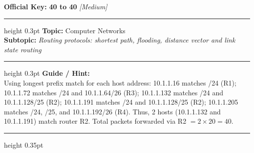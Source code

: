 \documentclass[a4paper,10pt]{article}
\begin{document}
\begin{tcolorbox}
\textbf{Official Key:} \textbf{\large 40 to 40} \hfill \textit{\small [Medium]}
\vspace{2pt}\hrule height 0.3pt\vspace{3pt}
\textbf{Topic:} Computer Networks \\
\textbf{Subtopic:} \textit{Routing protocols: shortest path, flooding, distance vector and link state routing}
\vspace{2pt}\hrule height 0.3pt\vspace{3pt}
\textbf{Guide / Hint:} \\
{\small Using longest prefix match for each host address: 10.1.1.16 matches /24 (R1); 10.1.1.72 matches /24 and 10.1.1.64/26 (R3); 10.1.1.132 matches /24 and 10.1.1.128/25 (R2); 10.1.1.191 matches /24 and 10.1.1.128/25 (R2); 10.1.1.205 matches /24, /25, and 10.1.1.192/26 (R4). Thus, 2 hosts (10.1.1.132 and 10.1.1.191) match router R2. Total packets forwarded via R2 $= 2 \times 20 = 40$.}

\end{tcolorbox}
\vspace{6pt}\hrule height 0.35pt\vspace{6pt}
\noindent
\end{document}
